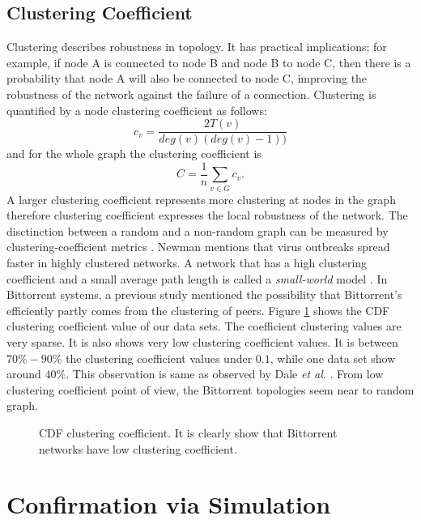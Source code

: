 \documentclass[10pt,conference,letterpaper]{IEEEtran}
\begin{document}
\subsection{Clustering Coefficient}\label{clusteringcoef}

Clustering describes robustness in topology. 
It has practical implications; for example, if node A is connected to node B and node B to node C, then there is a probability that node A will also be
connected to node C, improving the robustness of the network against the failure of a connection.  
Clustering is quantified by a node clustering coefficient as follows:
\begin{equation}
c_v = \frac{2T(v)}{deg(v) (deg(v)-1))}
\end{equation} 
and for the whole graph the clustering coefficient is
\begin{equation}
C = \frac{1}{n} \sum_{v \in G} c_v.
\end{equation}
A larger clustering coefficient represents more clustering at nodes in the graph therefore clustering coefficient expresses the local robustness of the network.
The disctinction between a random and a non-random graph can be measured by clustering-coefficient metrics \cite{watts1998collective}.
Newman \cite{newman2003properties} mentions that virus outbreaks spread faster in highly clustered networks. 
A network that has a high clustering coefficient and a small average path length is called a \textit{small-world} model \cite{watts1998collective}.
In Bittorrent systems, a previous study \cite{legout2007clustering} mentioned the possibility that Bittorrent's efficiently partly comes from the clustering of peers.
Figure \ref{fig:cdf-clustering} shows the CDF clustering coefficient value of our data sets.
The coefficient clustering values are very sparse. 
It is also shows very low clustering coefficient values. 
It is between $70\% - 90\%$ the clustering coefficient values under $0.1$, while one data set show around $40\%$. 
This observation is same as observed by Dale \textit{et al}. \cite{dale2008evolution}.
From low clustering coefficient point of view, the Bittorrent topologies seem near to random graph.
\begin{figure}
\centering
{}
\caption{CDF clustering coefficient. It is clearly show that Bittorrent networks have low clustering coefficient.} 
\label{fig:cdf-clustering}
\end{figure}


\section{Confirmation via Simulation}\label{simulation}
\end{document}
